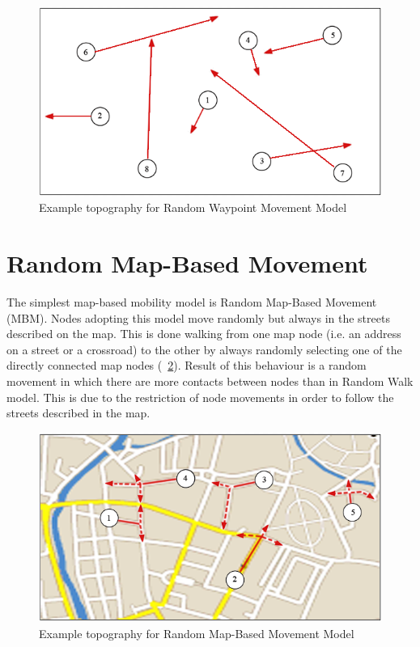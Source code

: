 \begin{figure}[htpb]
  \begin{center}
    \includegraphics[scale=0.6]{4-movimento/img/random_waypoint.png}
    \caption{Example topography for Random Waypoint Movement Model}    
    \label{fig:random_waypoint}
  \end{center}
\end{figure}

\section{Random Map-Based Movement}
The simplest map-based mobility model is Random Map-Based Movement (MBM). Nodes adopting this model move randomly but always in the streets described on the map. This is done walking from one map node (i.e. an address on a street or a crossroad) to the other by always randomly selecting one of the directly connected map nodes (\figurename~\ref{fig:random_map}). Result of this behaviour is a random movement in which there are more contacts between nodes than in Random Walk model. This is due to the restriction of node movements in order to follow the streets described in the map.
\begin{figure}[htpb]
  \begin{center}
    \includegraphics[scale=0.6]{4-movimento/img/random_map.png}
    \caption{Example topography for Random Map-Based Movement Model}    
    \label{fig:random_map}
  \end{center}
\end{figure}

